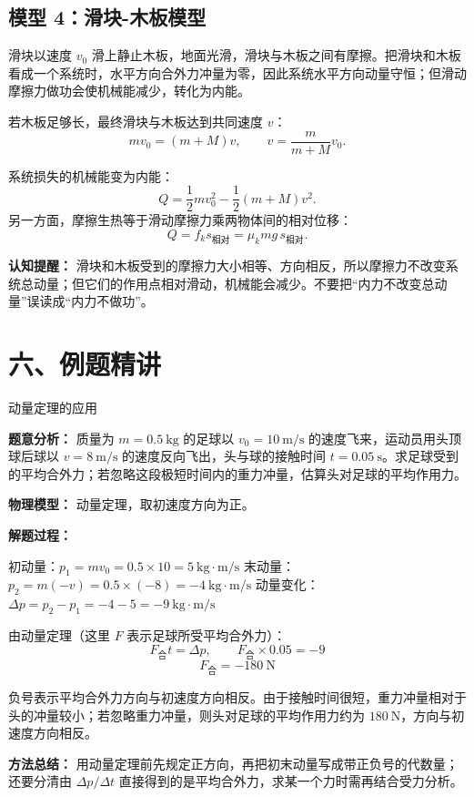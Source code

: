 \subsection*{模型 4：滑块-木板模型}

滑块以速度 $v_0$ 滑上静止木板，地面光滑，滑块与木板之间有摩擦。把滑块和木板看成一个系统时，水平方向合外力冲量为零，因此系统水平方向动量守恒；但滑动摩擦力做功会使机械能减少，转化为内能。

\begin{center}


\label{fig:slider-plank-momentum}
\end{center}

若木板足够长，最终滑块与木板达到共同速度 $v$：
\[
mv_0=(m+M)v,\qquad v=\frac{m}{m+M}v_0.
\]

系统损失的机械能变为内能：
\[
Q=\frac12mv_0^2-\frac12(m+M)v^2.
\]
另一方面，摩擦生热等于滑动摩擦力乘两物体间的相对位移：
\[
Q=f_k s_{\text{相对}}=\mu_k mg\,s_{\text{相对}}.
\]

\textbf{认知提醒：} 滑块和木板受到的摩擦力大小相等、方向相反，所以摩擦力不改变系统总动量；但它们的作用点相对滑动，机械能会减少。不要把“内力不改变总动量”误读成“内力不做功”。

\section*{六、例题精讲}

\begin{examplebox}{动量定理的应用}

\textbf{题意分析：} 质量为 $m = 0.5\ \mathrm{kg}$ 的足球以 $v_0 = 10\ \mathrm{m/s}$ 的速度飞来，运动员用头顶球后球以 $v = 8\ \mathrm{m/s}$ 的速度反向飞出，头与球的接触时间 $t = 0.05\ \mathrm{s}$。求足球受到的平均合外力；若忽略这段极短时间内的重力冲量，估算头对足球的平均作用力。

\textbf{物理模型：} 动量定理，取初速度方向为正。

\textbf{解题过程：}

初动量：$p_1 = mv_0 = 0.5 \times 10 = 5\ \mathrm{kg \cdot m/s}$
末动量：$p_2 = m(-v) = 0.5 \times (-8) = -4\ \mathrm{kg \cdot m/s}$
动量变化：$\Delta p = p_2 - p_1 = -4 - 5 = -9\ \mathrm{kg \cdot m/s}$

由动量定理（这里 $F$ 表示足球所受平均合外力）：
\[
F_{\text{合}} t = \Delta p,\qquad F_{\text{合}} \times 0.05 = -9
\]
\[
F_{\text{合}} = -180\ \mathrm{N}
\]

负号表示平均合外力方向与初速度方向相反。由于接触时间很短，重力冲量相对于头的冲量较小；若忽略重力冲量，则头对足球的平均作用力约为 $180\ \mathrm{N}$，方向与初速度方向相反。

\textbf{方法总结：} 用动量定理前先规定正方向，再把初末动量写成带正负号的代数量；还要分清由 $\Delta p/\Delta t$ 直接得到的是平均合外力，求某一个力时需再结合受力分析。

\end{examplebox}

